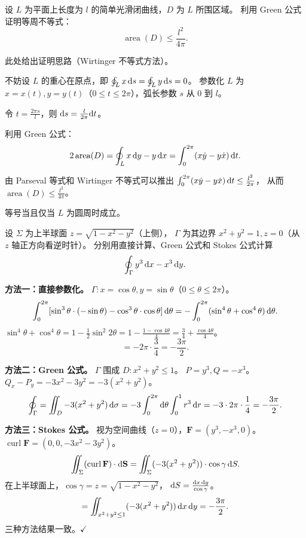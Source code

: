 \documentclass{article}
\DeclareMathOperator{\area}{area}
\DeclareMathOperator{\curl}{curl}
\begin{document}
\begin{exercise}
  设 $L$ 为平面上长度为 $l$ 的简单光滑闭曲线，$D$ 为 $L$ 所围区域。
  利用 Green 公式证明等周不等式：
  \[
    \area(D) \le \frac{l^2}{4\pi}.
  \]
\end{exercise}

\begin{solution}
  此处给出证明思路（Wirtinger 不等式方法）。

  不妨设 $L$ 的重心在原点，即 $\oint_L x\,\mathrm{d} s = \oint_L y\,\mathrm{d} s = 0$。
  参数化 $L$ 为 $x = x(t), y = y(t)$（$0 \le t \le 2\pi$），弧长参数 $s$ 从 $0$ 到 $l$。

  令 $t = \frac{2\pi s}{l}$，则 $\mathrm{d} s = \frac{l}{2\pi}\mathrm{d} t$。

  利用 Green 公式：
  \[
    2\area(D) = \oint_L x\,\dif y - y\,\dif x
    = \int_0^{2\pi} (x\dot{y} - y\dot{x}) \,\dif t.
  \]

  由 Parseval 等式和 Wirtinger 不等式可以推出
  $\int_0^{2\pi}(x\dot{y}-y\dot{x})\,\mathrm{d} t \le \frac{l^2}{2\pi}$，
  从而 $\area(D) \le \frac{l^2}{4\pi}$。

  等号当且仅当 $L$ 为圆周时成立。
\end{solution}

\begin{exercise}[综合——综合应用三大公式]
  设 $\Sigma$ 为上半球面 $z = \sqrt{1-x^2-y^2}$（上侧），
  $\Gamma$ 为其边界 $x^2+y^2=1, z=0$（从 $z$ 轴正方向看逆时针）。
  分别用直接计算、Green 公式和 Stokes 公式计算
  \[
    \oint_\Gamma y^3 \,\mathrm{d} x - x^3 \,\mathrm{d} y.
  \]
\end{exercise}

\begin{solution}
  \textbf{方法一：直接参数化。}
  $\Gamma: x = \cos\theta, y = \sin\theta$（$0 \le \theta \le 2\pi$）。
  \[
    \int_0^{2\pi} [\sin^3\theta\cdot(-\sin\theta) -
    \cos^3\theta\cdot\cos\theta] \,\mathrm{d}\theta
    = -\int_0^{2\pi} (\sin^4\theta + \cos^4\theta) \,\mathrm{d}\theta.
  \]
  $\sin^4\theta+\cos^4\theta = 1 - \frac{1}{2}\sin^2 2\theta =
  1-\frac{1-\cos 4\theta}{4} = \frac{3}{4}+\frac{\cos 4\theta}{4}$。
  \[
    = -2\pi\cdot\frac{3}{4} = -\frac{3\pi}{2}.
  \]

  \textbf{方法二：Green 公式。}
  $\Gamma$ 围成 $D: x^2+y^2\le 1$。
  $P = y^3, Q = -x^3$。$Q_x - P_y = -3x^2 - 3y^2 = -3(x^2+y^2)$。
  \[
    \oint_\Gamma = \iint_D -3(x^2+y^2) \,\mathrm{d}\sigma
    = -3\int_0^{2\pi}\mathrm{d}\theta\int_0^1 r^3 \,\mathrm{d} r
    = -3\cdot 2\pi\cdot\frac{1}{4}
    = -\frac{3\pi}{2}.
  \]

  \textbf{方法三：Stokes 公式。}
  视为空间曲线（$z=0$），$\mathbf{F} = (y^3, -x^3, 0)$。
  $\curl\mathbf{F} = (0, 0, -3x^2-3y^2)$。
  \[
    \iint_\Sigma (\curl\mathbf{F})\cdot\dif\mathbf{S}
    = \iint_\Sigma (-3(x^2+y^2)) \cdot \cos\gamma \,\dif S.
  \]
  在上半球面上，$\cos\gamma = z = \sqrt{1-x^2-y^2}$，
  $\mathrm{d} S = \frac{\mathrm{d} x\,\mathrm{d} y}{\cos\gamma}$。
  \[
    = \iint_{x^2+y^2\le 1} (-3(x^2+y^2)) \,\mathrm{d} x\,\mathrm{d} y
    = -\frac{3\pi}{2}.
  \]
  三种方法结果一致。$\checkmark$
\end{solution}
\end{document}
